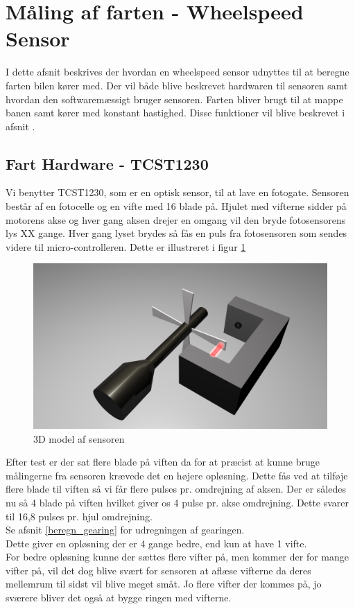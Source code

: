 \section{Måling af farten - Wheelspeed Sensor}
\label{fartmål}
I dette afsnit beskrives der hvordan en wheelspeed sensor udnyttes til at beregne farten bilen kører med. Der vil både blive beskrevet hardwaren til sensoren samt hvordan den softwaremæssigt bruger sensoren. Farten bliver brugt til at mappe banen samt kører med konstant hastighed. Disse funktioner vil blive beskrevet i afsnit . \\

\subsection{Fart Hardware - TCST1230}
\label{fartmål_hardware}
Vi benytter TCST1230, som er en optisk sensor, til at lave en fotogate. Sensoren består af en fotocelle og en vifte med 16 blade på. Hjulet med vifterne sidder på motorens akse og hver gang aksen drejer en omgang vil den bryde fotosensorens lys XX gange. Hver gang lyset brydes så fås en puls fra fotosensoren som sendes videre til micro-controlleren. Dette er illustreret i figur \ref{wheelspeed3D} 

\begin{figure}[h!]
\center
\includegraphics[scale=0.2]{./Graphics/Wheelspeed_D}
\caption{3D model af sensoren}
\label{wheelspeed3D}
\end{figure}

Efter test er der sat flere blade på viften da for at præcist at kunne bruge målingerne fra sensoren krævede det en højere opløsning. Dette fås ved at tilføje flere blade til viften så vi får flere pulses pr. omdrejning af aksen. Der er således nu så 4 blade på viften hvilket giver os 4 pulse pr. akse omdrejning. Dette svarer til 16,8 pulses pr. hjul omdrejning. \\
Se afsnit \ref{beregn_gearing} for udregningen af gearingen. \\
Dette giver en opløsning der er 4 gange bedre, end kun at have 1 vifte. \\
For bedre opløsning kunne der sættes flere vifter på, men kommer der for mange vifter på, vil det dog blive svært for sensoren at aflæse vifterne da deres mellemrum til sidst vil blive meget småt. Jo flere vifter der kommes på, jo sværere bliver det også at bygge ringen med vifterne. \\

